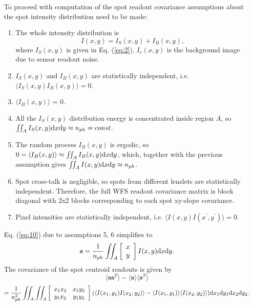 To proceed with computation of the spot
readout covariance assumptions about the spot intensity distribution need to
be made:
\begin{enumerate}
	\item The whole intensity distribution is
	\begin{equation} \label{eq:whole-intensity}
		I(x,y) = I_{S}(x,y) + I_{B}(x,y),
	\end{equation}
	where $I_{S}(x,y)$ is given in Eq. (\ref{eq:2}), $I_{e}(x,y)$ is the
	background image due to sensor readout noise.
	\item $I_{S}(x,y)$ and $I_{B}(x,y)$ are statistically independent, i.e.
	$\langle I_{S}(x,y)I_{B}(x,y) \rangle = 0$.
	\item $\langle I_{B}(x,y) \rangle$ = 0.
	\item All the $I_{S}(x,y)$ distribution energy is concentrated inside region
	$A$, so \\ $ \iint_A I_{S}(x,y) {\rm d}x{\rm d}y \approx n_{ph} = const$.
	\item The random process $I_{B}(x,y)$ is ergodic, so
	$0 = \langle I_{B}(x,y)
	\rangle \approx \iint_{A} I_{B}(x,y) {\rm d}x {\rm d}y$, which, together
	with the previous assumption gives
	$ \iint_A I(x,y) {\rm d}x{\rm d}y \approx n_{ph} $.
	\item Spot cross-talk is negligible, so
  spots from different lenslets are statistically independent. Therefore, the
  full WFS readout covariance matrix is block diagonal with 2x2 blocks
  corresponding to each spot xy-slope covariance.
  \item Pixel intensities are statistically independent, i.e.
  $\langle I(x,y)I(x^{\prime},y^{\prime}) \rangle = 0$.
\end{enumerate}
Eq. (\ref{eq:10}) due to assumptions 5, 6 simplifies to
\begin{eqnarray}
  \label{eq:11}
  \bm{s} =
  \frac{1} {n_{ph}}
  \iint_A
  \left[ \begin{array}{c} x \\ y \end{array} \right]
  I(x,y) {\rm d}x{\rm d}y.
\end{eqnarray}
The covariance of the spot centroid readouts is given by
\begin{equation}
  \label{eq:12}
  \langle \bm{s} \bm{s}^{T} \rangle -
  \langle \bm{s} \rangle \langle \bm{s}^{T} \rangle
\end{equation}
$$
  = {1 \over n_{ph}^2} \iint_A \iint_A
  \left[
  \begin{array}{cc} x_{1} x_{2} & x_{1} y_{2} \\
                    y_{1} x_{2} & y_{1} y_{2} \end{array}
  \right]
  ( \langle I(x_{1},y_{1}) I(x_{2},y_{2}) \rangle
  - \langle I(x_{1},y_{1}) \rangle
    \langle I(x_{2},y_{2}) \rangle )
    {\rm d}x_{1}{\rm d}y_{1} {\rm d}x_{2}{\rm d}y_{2}.
$$
